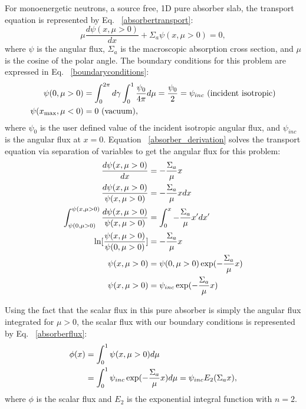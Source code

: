 For monoenergetic neutrons, a source free, 1D pure absorber slab, the transport equation is represented by Eq. ~\eqref{absorbertransport}:
\begin{equation}
\mu \frac{d\psi (x,\mu>0)}{dx} + \Sigma_a \psi(x,\mu>0) = 0,
\label{absorbertransport}
\end{equation}
where $\psi$ is the angular flux, $\Sigma_a$ is the macroscopic absorption cross section, and $\mu$ is the cosine of the polar angle. The boundary conditions for this problem are expressed in Eq. ~\eqref{boundaryconditions}:
\begin{align}
\label{boundaryconditions}
\psi(0,\mu>0) &= \int_{0}^{2\pi}d\gamma \int_{0}^{1}\frac{\psi_{0}}{4\pi} d\mu = \frac{\psi_{0}}{2}  = \psi_{inc} \text{ (incident isotropic)} \notag \\
\psi(x_{\text{max}},\mu<0) &= 0 \text{ (vacuum)},
\end{align}
where $\psi_{0}$ is the user defined value of the incident isotropic angular flux, and $\psi_{inc}$ is the angular flux at $x = 0$. Equation ~\eqref{absorber_derivation} solves the transport equation via separation of variables to get the angular flux for this problem:
\begin{align}
\label{absorber_derivation}
\frac{d\psi(x,\mu>0)}{dx} &= -\frac{\Sigma_a}{\mu} x \notag \\
\frac{d\psi(x,\mu>0)}{\psi(x,\mu>0)} &= -\frac{\Sigma_a}{\mu} x dx \notag \\
\int_{\psi(0,\mu>0)}^{\psi(x,\mu>0)}\frac{d\psi(x,\mu>0)}{\psi(x,\mu>0)} &= \int_{0}^{x}-\frac{\Sigma_a}{\mu} x' dx' \notag \\
\ln[\frac{\psi(x,\mu>0)}{\psi(0,\mu>0)}] &= -\frac{\Sigma_a}{\mu} x \notag \\
\psi(x,\mu>0) & = \psi(0,\mu>0)\exp(-\frac{\Sigma_a}{\mu} x) \notag \\
\psi(x,\mu>0) & = \psi_{inc}\exp(-\frac{\Sigma_a}{\mu} x) 
\end{align}

Using the fact that the scalar flux in this pure absorber is simply the angular flux integrated for $\mu > 0$, the scalar flux with our boundary conditions is represented by Eq. ~\eqref{absorberflux}:
\begin{align}
\phi(x) &= \int_{0}^{1}\psi(x,\mu>0) d\mu \notag \\
&= \int_{0}^{1}\psi_{inc}\exp(-\frac{\Sigma_a}{\mu} x) d\mu = \psi_{inc} E_{2}(\Sigma_a x),
\label{absorberflux}
\end{align}
where $\phi$ is the scalar flux and $E_2$ is the exponential integral function with $n=2$. 

